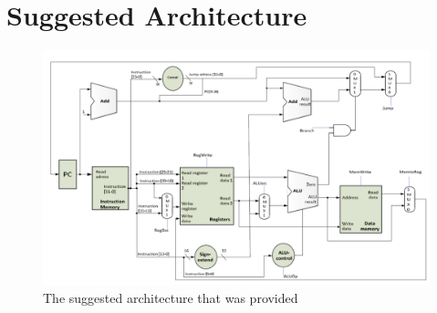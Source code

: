 \chapter{Suggested Architecture}
\label{app:suggested_architecture}

\begin{figure}[h]
    \centering
    \includegraphics[width=\textwidth]{img/suggested_architecture}
    \caption{The suggested architecture that was provided}
\end{figure}

